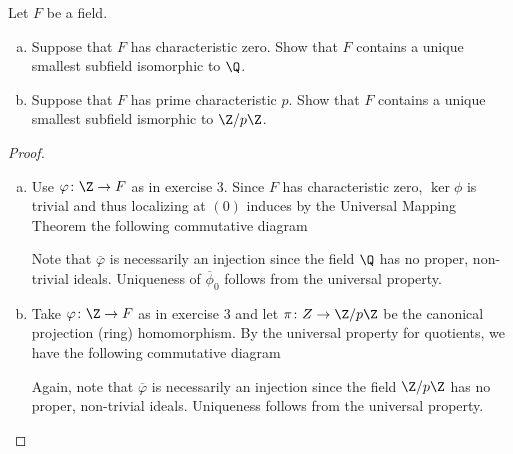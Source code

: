 \documentclass[10pt]{amsart}
\begin{document}
\begin{thm}
  Let $F$ be a field.
  \begin{enumerate}[(a)]
  \item
    Suppose that $F$ has characteristic zero.
    Show that $F$ contains a unique smallest subfield isomorphic to $\Q$.
  \item
    Suppose that $F$ has prime characteristic $p$.
    Show that $F$ contains a unique smallest subfield ismorphic to $\Z/p\Z$.
  \end{enumerate}
  \begin{proof}
    \begin{enumerate}[(a)]
    \item
      Use $\varphi \colon \Z \rightarrow F$ as in exercise 3.
      Since $F$ has characteristic zero, $\ker\phi$ is trivial and thus localizing at $(0)$ induces by the Universal Mapping Theorem the following commutative diagram\\
      \begin{center}
      \end{center}
      Note that $\overline{\varphi}$ is necessarily an injection since the field $\Q$ has no proper, non-trivial ideals.
      Uniqueness of $\overline{\phi}_0$ follows from the universal property.
    \item
      Take $\varphi \colon \Z \rightarrow F$ as in exercise 3 and let $\pi \colon Z \rightarrow \Z/p\Z$ be the canonical projection (ring) homomorphism.
      By the universal property for quotients, we have the following commutative diagram\\
      \begin{center}
      \end{center}
      Again, note that $\overline{\varphi}$ is necessarily an injection since the field $\Z/p\Z$ has no proper, non-trivial ideals.
      Uniqueness follows from the universal property.
    \end{enumerate}
  \end{proof}
\end{thm}
\end{document}
